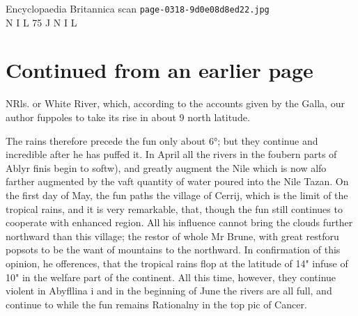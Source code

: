 \documentclass{article}
\begin{document}
\begin{center}
{\Large Encyclopaedia Britannica scan \texttt{page-0318-9d0e08d8ed22.jpg}}\\[0.5em]
N I L 75 J N I L
\end{center}
\section*{Continued from an earlier page}
NRls. or White River, which, according to the accounts given by the Galla, our author fuppoles to take its rise in about 9 north latitude.

The rains therefore precede the fun only about 6°; but they continue and incredible after he has puffed it. In April all the rivers in the foubern parts of Ablyr finis begin to softw), and greatly augment the Nile which is now alfo farther augmented by the vaft quantity of water poured into the Nile Tazan. On the first day of May, the fun paths the village of Cerrij, which is the limit of the tropical rains, and it is very remarkable, that, though the fun still continues to cooperate with enhanced region. All his influence cannot bring the clouds further northward than this village; the restor of whole Mr Brune, with great restforu popsots to be the want of mountains to the northward. In confirmation of this opinion, he offerences, that the tropical rains flop at the latitude of 14" infuse of 10" in the welfare part of the continent. All this time, however, they continue violent in Abyfllina i and in the beginning of June the rivers are all full, and continue to while the fun remains Rationalny in the top pic of Cancer.
\end{document}

